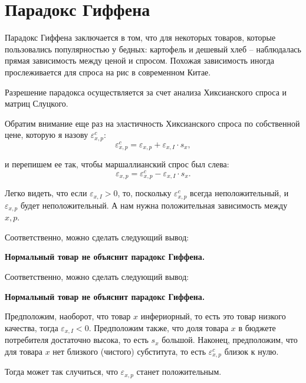 \documentclass{beamer}
\begin{document}
\section{Парадокс Гиффена}

\begin{frame}

Парадокс Гиффена заключается в том, что для некоторых товаров, которые пользовались популярностью у бедных: картофель и дешевый хлеб – наблюдалась прямая зависимость между ценой и спросом. Похожая зависимость иногда прослеживается для спроса на рис в современном Китае.

Разрешение парадокса осуществляется за счет анализа Хиксианского спроса и матриц Слуцкого. 

\end{frame}

\begin{frame}

Обратим внимание еще раз на эластичность Хиксианского спроса по собственной цене, которую я назову $\varepsilon^c_{x,p}$:
$$\varepsilon^c_{x,p} = \varepsilon_{x,p} + \varepsilon_{x,I} \cdot s_{x},$$

и перепишем ее так, чтобы маршаллианский спрос был слева:
$$\varepsilon_{x,p} = \varepsilon^c_{x,p} - \varepsilon_{x,I} \cdot s_{x}.$$

Легко видеть, что если $\varepsilon_{x,I} > 0$, то, поскольку $\varepsilon^c_{x,p}$ всегда неположительный, и $\varepsilon_{x,p}$ будет неположительный. А нам нужна положительная зависимость между $x,p$. 
\end{frame}

\begin{frame}

Соответственно, можно сделать следующий вывод:

\textbf{Нормальный товар не объяснит парадокс Гиффена.}

\end{frame}

\begin{frame}

Соответственно, можно сделать следующий вывод:

\textbf{Нормальный товар не объяснит парадокс Гиффена.}

\end{frame}

\begin{frame}
Предположим, наоборот, что товар $x$ инфериорный, то есть это товар низкого качества, тогда $\varepsilon_{x,I} < 0$. Предположим также, что доля товара $x$ в бюджете потребителя достаточно высока, то есть $s_{x}$ большой. Наконец, предположим, что для товара $x$ нет близкого (чистого) субститута, то есть $\varepsilon^c_{x,p}$ близок к нулю.

Тогда может так случиться, что $\varepsilon_{x,p}$ станет положительным.

\end{frame}
\end{document}
